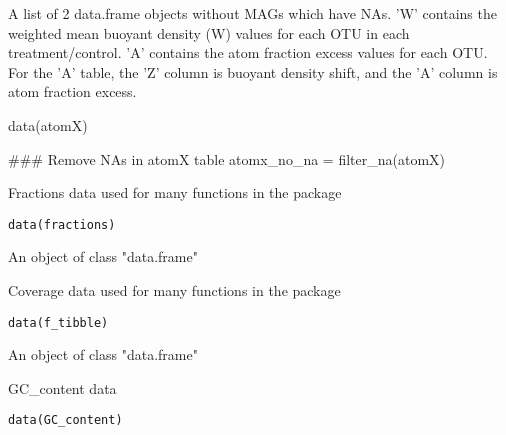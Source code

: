 \documentclass[a4paper]{book}
\begin{document}
%
\begin{Value}
A list of 2 data.frame objects without MAGs which have NAs. 'W' contains the weighted mean buoyant density (W) values for each OTU in each treatment/control. 'A' contains the atom fraction excess values for each OTU. For the 'A' table, the 'Z' column is buoyant density shift, and the 'A' column is atom fraction excess.
\end{Value}
%
\begin{Examples}
\begin{ExampleCode}
data(atomX)



### Remove NAs in atomX table
atomx_no_na = filter_na(atomX)


\end{ExampleCode}
\end{Examples}
%
\begin{Description}\relax
Fractions data used for many functions in the package
\end{Description}
%
\begin{Usage}
\begin{verbatim}
data(fractions)
\end{verbatim}
\end{Usage}
%
\begin{Format}
An object of class "data.frame"
\end{Format}
%
\begin{Description}\relax
Coverage data used for many functions in the package
\end{Description}
%
\begin{Usage}
\begin{verbatim}
data(f_tibble)
\end{verbatim}
\end{Usage}
%
\begin{Format}
An object of class "data.frame"
\end{Format}
%
\begin{Description}\relax
GC\_content data
\end{Description}
%
\begin{Usage}
\begin{verbatim}
data(GC_content)
\end{verbatim}
\end{Usage}
\end{document}
